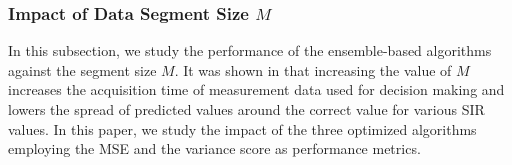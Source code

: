 

\subsubsection{Impact of Data Segment Size $M$}
In this subsection, we study the performance of the ensemble-based algorithms against the segment size $M$. It was shown in \cite{Candell_ISIT_2019} that increasing the value of $M$ increases the acquisition time of measurement data used for decision making and lowers the spread of predicted values around the correct value for various SIR values. In this paper, we study the impact of the three optimized algorithms employing the MSE and the variance score as performance metrics.

